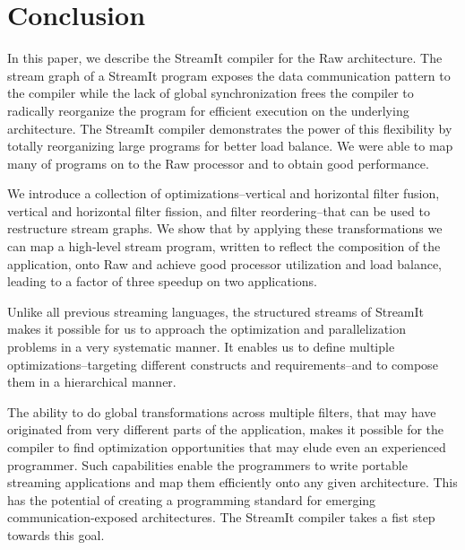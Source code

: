 \section{Conclusion}
\label{sec:conclusion}

In this paper, we describe the StreamIt compiler for the Raw
architecture.  The stream graph of a StreamIt program exposes the data
communication pattern to the compiler while the lack of global
synchronization frees the compiler to radically reorganize the program
for efficient execution on the underlying architecture. The StreamIt
compiler demonstrates the power of this flexibility by totally
reorganizing large programs for better load balance. We were able to
map many of programs on to the Raw processor and to obtain good
performance.

We introduce a collection of optimizations--vertical and horizontal
filter fusion, vertical and horizontal filter fission, and filter
reordering--that can be used to restructure stream graphs.  We show
that by applying these transformations we can map a high-level stream
program, written to reflect the composition of the application, onto
Raw and achieve good processor utilization and load balance, leading
to a factor of three speedup on two applications.

Unlike all previous streaming languages, the structured streams of
StreamIt makes it possible for us to approach the optimization and
parallelization problems in a very systematic manner. It enables us to
define multiple optimizations--targeting different constructs and
requirements--and to compose them in a hierarchical manner.

The ability to do global transformations across multiple filters, that
may have originated from very different parts of the application,
makes it possible for the compiler to find optimization opportunities
that may elude even an experienced programmer.  Such capabilities
enable the programmers to write portable streaming applications and
map them efficiently onto any given architecture. This has the
potential of creating a programming standard for emerging
communication-exposed architectures.  The StreamIt compiler takes a
fist step towards this goal.

